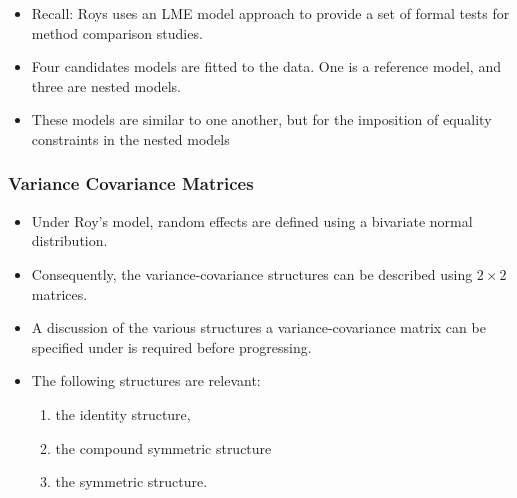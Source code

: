 \documentclass[compress]{beamer}        %
\begin{document}
		\begin{frame}
			\begin{itemize}
				
				\item Recall: Roys uses an LME model approach to provide a set of formal tests for method comparison studies.\\
				
				\item Four candidates models are fitted to the data. One is a reference model, and three are nested models.
				
				\item 
				These models are similar to one another, but for the imposition of equality constraints in the nested models
				
				
				
			\end{itemize}
		\end{frame}
\begin{frame}
	\frametitle{Variance Covariance Matrices }
	\large
	\begin{itemize}\itemsep0.4cm
		\item Under Roy's model, random effects are defined using a bivariate normal distribution. 
		\item Consequently, the variance-covariance structures can be described using $2 \times 2$  matrices. \item A discussion of the various structures a variance-covariance matrix can be specified under is required before progressing. 
		\item The following structures are relevant:
		\begin{enumerate}
			\item the identity structure, 
			\item the compound symmetric structure
			\item the symmetric structure.
		\end{enumerate}
	\end{itemize}
\end{frame}
\end{document}
